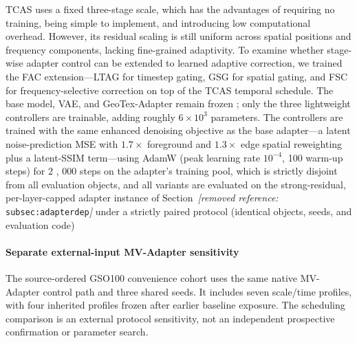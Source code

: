 \documentclass[times,twocolumn,final]{elsarticle}
\providecommand{\DIFadd}[1]{{\protect\color{blue} \sf #1}} %
\providecommand{\DIFdel}[1]{{\protect\color{red} \scriptsize #1}} %
\providecommand{\DIFaddbegin}{} %
\providecommand{\DIFaddend}{} %
\providecommand{\DIFdelbegin}{} %
\providecommand{\DIFdelend}{} %
\begin{document}
\DIFdelbegin \DIFdel{TCAS uses a fixed three-stage scale, which has the advantages of requiring no training, being simple to implement, and introducing low computational overhead. However, its residual scaling is still uniform across spatial positions and frequency components, lacking fine-grained adaptivity.
To examine whether stage-wise adapter control can be extended to learned adaptive correction, we trained the FAC extension---LTAG for timestep gating, GSG for spatial gating, and FSC for frequency-selective correction on top of the TCAS temporal schedule. The base model, VAE, and GeoTex-Adapter remain frozen ; only the three lightweight controllers are trainable, adding roughly $6\times10^{3}$ parameters. The controllers are trained with the same enhanced denoising objective as the base adapter---a latent noise-prediction MSE with $1.7\times$ foreground and $1.3\times$ edge spatial reweighting plus a latent-SSIM term---using AdamW (peak learning rate $10^{-4}$, 100 warm-up steps) for 2}%
\DIFdel{,}%
\DIFdel{000 steps on the adapter's training pool, which is strictly disjoint from all evaluation objects, and all variants are evaluated on the strong-residual, per-layer-capped adapter instance of Section~\textit{[removed reference: }\texttt{subsec:adapterdep}\textit{]} under a strictly paired protocol (identical objects, seeds, and evaluation code)}\DIFdelend \DIFaddbegin \paragraph{Separate external-input MV-Adapter sensitivity}
\DIFadd{The source-ordered GSO100 convenience cohort uses the same native MV-Adapter control path and three shared seeds. It includes seven scale/time profiles, with four inherited profiles frozen after earlier baseline exposure. The scheduling comparison is an external protocol sensitivity, not an independent prospective confirmation or parameter search}\DIFaddend .
\end{document}
